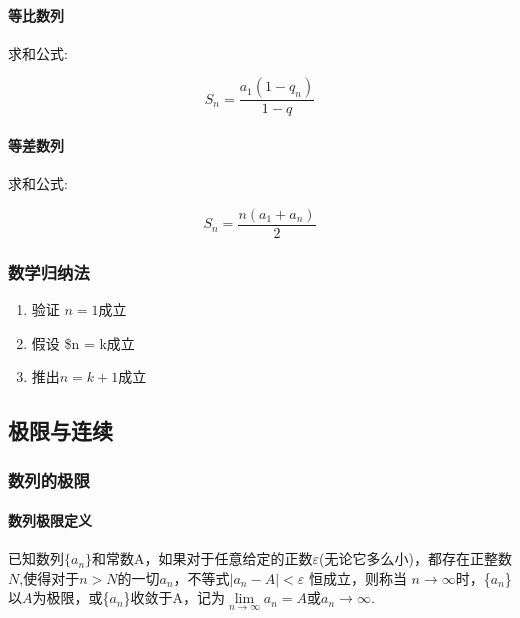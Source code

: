 \documentclass[
]{article}
\begin{document}
\hypertarget{ux7b49ux6bd4ux6570ux5217}{%
\paragraph{等比数列}\label{ux7b49ux6bd4ux6570ux5217}}

求和公式:

\[S_n = \frac{a_1(1-q_n)}{1-q}\]

\hypertarget{ux7b49ux5deeux6570ux5217}{%
\paragraph{等差数列}\label{ux7b49ux5deeux6570ux5217}}

求和公式:

\[S_n = \frac{n(a_1+a_n)}{2}\]

\hypertarget{ux6570ux5b66ux5f52ux7eb3ux6cd5}{%
\subsubsection{数学归纳法}\label{ux6570ux5b66ux5f52ux7eb3ux6cd5}}

\begin{enumerate}
\def\labelenumi{\arabic{enumi}.}
\item
  验证 \(n = 1 \)成立
\item
  假设 \$n = k成立
\item
  推出\(n = k + 1\)成立
\end{enumerate}

\hypertarget{ux6781ux9650ux4e0eux8fdeux7eed}{%
\subsection{极限与连续}\label{ux6781ux9650ux4e0eux8fdeux7eed}}

\hypertarget{ux6570ux5217ux7684ux6781ux9650}{%
\subsubsection{数列的极限}\label{ux6570ux5217ux7684ux6781ux9650}}

\hypertarget{ux6570ux5217ux6781ux9650ux5b9aux4e49}{%
\paragraph{数列极限定义}\label{ux6570ux5217ux6781ux9650ux5b9aux4e49}}

已知数列\(\{a_n\}\)和常数A，如果对于任意给定的正数\(\varepsilon\)(无论它多么小)，都存在正整数\(N\),使得对于\(n> N\)的一切\(a_n\)，不等式\(\vert a_n - A \vert < \varepsilon\)
恒成立，则称当
\(n \rightarrow \infty\)时，\{\(a_n\)\}以\(A\)为极限，或\{\(a_n\)\}收敛于A，记为\(\lim\limits_{n \rightarrow \infty} a_n = A\)或\(a_n \rightarrow \infty\).
\end{document}
